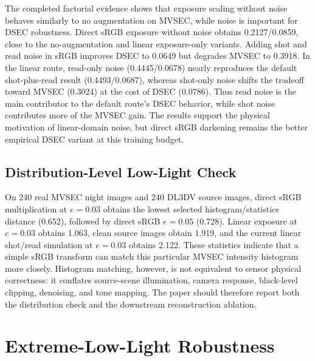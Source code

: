 \documentclass[10pt]{article}
\begin{document}
The completed factorial evidence shows that exposure scaling without noise
behaves similarly to no augmentation on MVSEC, while noise is important for
DSEC robustness.  Direct sRGB exposure without noise obtains 0.2127/0.0859,
close to the no-augmentation and linear exposure-only variants.  Adding shot
and read noise in sRGB improves DSEC to 0.0649 but degrades MVSEC to 0.3918.
In the linear route, read-only noise (0.4445/0.0678) nearly reproduces the
default shot-plus-read result (0.4493/0.0687), whereas shot-only noise shifts
the tradeoff toward MVSEC (0.3024) at the cost of DSEC (0.0786).  Thus read
noise is the main contributor to the default route's DSEC behavior, while shot
noise contributes more of the MVSEC gain.  The results support the physical
motivation of linear-domain noise, but direct sRGB darkening remains the better
empirical DSEC variant at this training budget.

\subsection{Distribution-Level Low-Light Check}

On 240 real MVSEC night images and 240 DL3DV source images, direct sRGB
multiplication at $e=0.03$ obtains the lowest selected histogram/statistics
distance (0.652), followed by direct sRGB $e=0.05$ (0.728).  Linear exposure at
$e=0.03$ obtains 1.063, clean source images obtain 1.919, and the current linear
shot/read simulation at $e=0.03$ obtains 2.122.  These statistics indicate that
a simple sRGB transform can match this particular MVSEC intensity histogram
more closely.  Histogram matching, however, is not equivalent to sensor
physical correctness: it conflates source-scene illumination, camera response,
black-level clipping, denoising, and tone mapping.  The paper should therefore
report both the distribution check and the downstream reconstruction ablation.

\section{Extreme-Low-Light Robustness}
\end{document}
